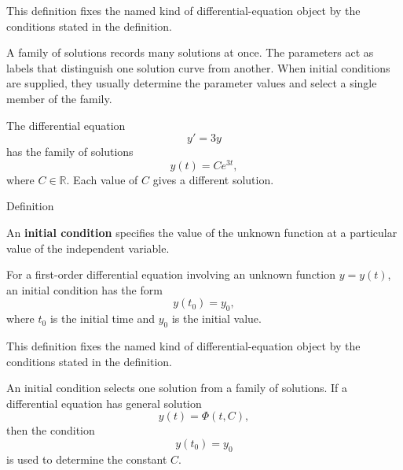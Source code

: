 \begin{remark*}
This definition fixes the named kind of differential-equation object by the
conditions stated in the definition.
\end{remark*}

\NoLocalDependencies

\begin{remark*}[Interpretation]
A family of solutions records many solutions at once. The parameters act as labels that distinguish one solution curve from another. When initial conditions are supplied, they usually determine the parameter values and select a single member of the family.
\end{remark*}

\begin{example*}
The differential equation
\[
y'=3y
\]
has the family of solutions
\[
y(t)=Ce^{3t},
\]
where $C\in\mathbb{R}$. Each value of $C$ gives a different solution.
\end{example*}



\begin{definitionbox}{Definition}
\begin{definition}
\label{def:ordinary-differential-equations-solutions-initial-condition}
An \textbf{initial condition} specifies the value of the unknown function at a particular value of the independent variable.

For a first-order differential equation involving an unknown function $y=y(t)$, an initial condition has the form
\[
y(t_0)=y_0,
\]
where $t_0$ is the initial time and $y_0$ is the initial value.
\end{definition}
\end{definitionbox}

\begin{remark*}
This definition fixes the named kind of differential-equation object by the
conditions stated in the definition.
\end{remark*}

\NoLocalDependencies

\begin{remark*}[Interpretation]
An initial condition selects one solution from a family of solutions. If a differential equation has general solution
\[
y(t)=\Phi(t,C),
\]
then the condition
\[
y(t_0)=y_0
\]
is used to determine the constant $C$.
\end{remark*}

